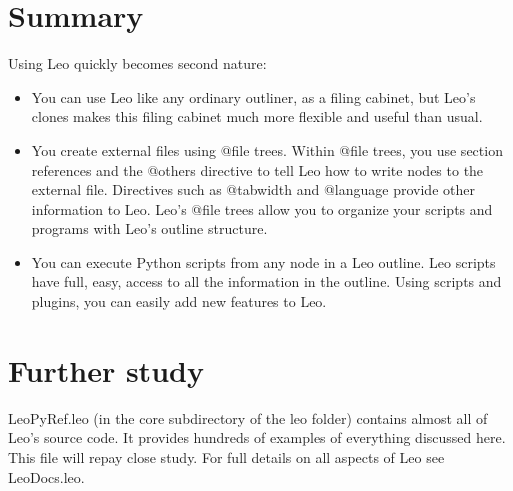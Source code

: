 \documentclass[a4paper,10pt,english]{sphinxmanual}
\begin{document}
\section{Summary}
\label{intro:summary}
Using Leo quickly becomes second nature:
\begin{itemize}
\item {} 
You can use Leo like any ordinary outliner, as a filing cabinet, but Leo's
clones makes this filing cabinet much more flexible and useful than usual.

\item {} 
You create external files using @file trees. Within @file trees, you use
section references and the @others directive to tell Leo how to write nodes
to the external file. Directives such as @tabwidth and @language provide other
information to Leo. Leo's @file trees allow you to organize your scripts
and programs with Leo's outline structure.

\item {} 
You can execute Python scripts from any node in a Leo outline. Leo scripts
have full, easy, access to all the information in the outline. Using scripts
and plugins, you can easily add new features to Leo.

\end{itemize}


\section{Further study}
\label{intro:further-study}
LeoPyRef.leo (in the core subdirectory of the leo folder) contains almost all of
Leo's source code. It provides hundreds of examples of everything discussed
here. This file will repay close study. For full details on all aspects of Leo
see LeoDocs.leo.
\end{document}
